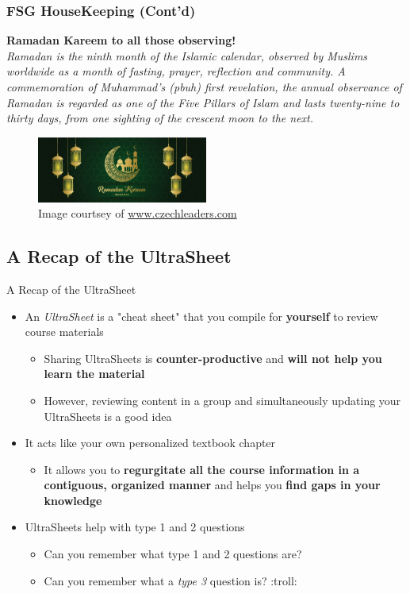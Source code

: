 \documentclass[hyperref={colorlinks,citecolor=blue,linkcolor=blue,urlcolor=blue}, aspectratio=1610]{beamer}
\begin{document}
\begin{frame}
  \frametitle{FSG HouseKeeping (Cont'd)}
  \textbf{Ramadan Kareem to all those observing!}\\
  \textit{Ramadan is the ninth month of the Islamic calendar, observed by Muslims worldwide as a month of fasting, prayer, reflection and community. A commemoration of Muhammad's (pbuh) first revelation, the annual observance of Ramadan is regarded as one of the Five Pillars of Islam and lasts twenty-nine to thirty days, from one sighting of the crescent moon to the next.} \\
  \centering
  \begin{figure}
    \includegraphics[width=0.5\textwidth]{ramadan_kareem.jpg}
    \caption{Image courtsey of \href{www.czechleaders.com}{www.czechleaders.com}}    
  \end{figure}
\end{frame}

\subsection{A Recap of the UltraSheet\texttrademark{}}
\begin{frame}{A Recap of the UltraSheet\texttrademark{}}
  \begin{itemize}
    \item An \textit{UltraSheet\texttrademark{}} is a "cheat sheet" that you compile for \textbf{yourself} to review course materials 
    \begin{itemize}
      \item Sharing UltraSheets\texttrademark{} is \textbf{counter-productive} and \textbf{will not help you learn the material}
      \item However, reviewing content in a group and simultaneously updating your UltraSheets\texttrademark{} is a good idea
    \end{itemize}
    \item It acts like your own personalized textbook chapter
    \begin{itemize}
      \item It allows you to \textbf{regurgitate all the course information in a contiguous, organized manner} and helps you \textbf{find gaps in your knowledge}
    \end{itemize}
    \item UltraSheets\texttrademark{} help with type 1 and 2 questions 
    \begin{itemize}
      \item Can you remember what type 1 and 2 questions are?
      \item Can you remember what a \textit{type 3} question is? :troll:
    \end{itemize}
  \end{itemize}

\end{frame}
\end{document}
